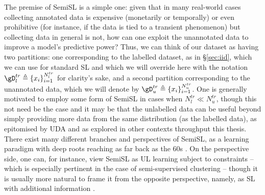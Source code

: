 The premise of \ac{SemiSL} is a simple one: given that in many real-world cases collecting annotated
data is expensive (monetarily or temporally) or even prohibitive (for instance, if the data is tied
to a transient phenomenon) but collecting data in general is not, how can one exploit the
unannotated data to improve a model's predictive power?
%
Thus, we can think of our dataset as having two partitions: one corresponding to the labelled
dataset, as in \S\ref{sec:iid}, which we can use for standard \acl{SL} and which we will override
here with the notation \( \gD^{tr}_l \triangleq \{ x_i \}_{i=1}^{N^{tr}_l} \) for clarity's sake,
and a second partition corresponding to the unannotated data, which we will denote by \( \gD^{tr}_u
\triangleq \{ x_i \}_{i=1}^{N^{tr}_u} \).
%
One is generally motivated to employ some form of \ac{SemiSL} in cases when \( N^{tr}_l \ll
N^{tr}_u \), though this not need be the case and it may be that the unlabelled data can be useful
beyond simply providing more data from the same distribution (as the labelled data), as epitomised
by \ac{UDA} and as explored in other contexts throughput this thesis.
%
There exist many different branches and perspectives of \ac{SemiSL}, as a learning paradigm with deep
roots reaching as far back as the 60s \citep{scudder1965probability, fralick1967learning}. 
%
On the perspective side, one can, for instance, view \ac{SemiSL} as \ac{UL} learning subject to
constraints -- which is especially pertinent in the case of semi-supervised clustering
\citep{bair2013semi} -- though it is usually more natural to frame it from the opposite
perspective, namely, as \ac{SL} with additional information \citep{chapelle2009semi}.

